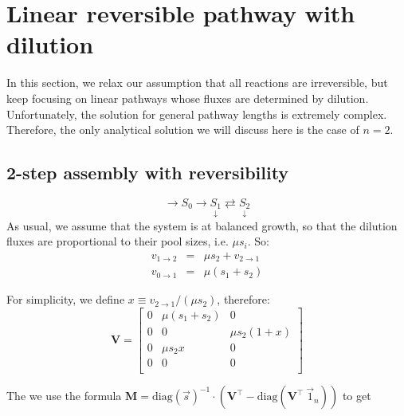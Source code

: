 \documentclass{article}
\begin{document}
\section{Linear reversible pathway with dilution}
In this section, we relax our assumption that all reactions are irreversible, but keep focusing on linear pathways whose fluxes are determined by dilution. Unfortunately, the solution for general pathway lengths is extremely complex. Therefore, the only analytical solution we will discuss here is the case of $n = 2$.

\subsection{2-step assembly with reversibility}

\begin{equation}
    \rightarrow S_0 
    \rightarrow \underset{\downarrow}{S_1}
    \rightleftarrows \underset{\downarrow}{S_2}
\end{equation}
As usual, we assume that the system is at balanced growth, so that the dilution fluxes are proportional to their pool sizes, i.e. $\mu s_i$. So:
\begin{eqnarray}
    v_{1 \rightarrow 2} &=& \mu s_2 + v_{2 \rightarrow 1}\\
    v_{0 \rightarrow 1} &=& \mu (s_1 + s_2)
\end{eqnarray}

For simplicity, we define $x \equiv v_{2 \rightarrow 1} / (\mu s_2)$, therefore:
\[\mathbf{V} =
    \begin{bmatrix}
        0 & \mu (s_1 + s_2) & 0\\
        0 & 0 & \mu s_2 (1 + x) \\
        0 & \mu s_2 x & 0 \\
        0 & 0 & 0 \\
    \end{bmatrix}
\]

The we use the formula $\mathbf{M} = \text{diag}(\vec{s})^{-1} \cdot \left( \mathbf{V}^\top - \text{diag}(\mathbf{V}^\top~\vec{1}_n) \right)$ to get
\end{document}
